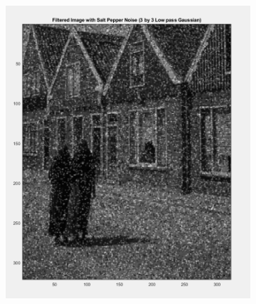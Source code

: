 \begin{figure} [ht]
    \centering
    \begin{subfigure}{0.4\textwidth}
        \includegraphics[width=\textwidth]{Resources/F7-a.png}
        \caption{}
        \label{fig:first}
    \end{subfigure}
    \hfill
    \begin{subfigure}{0.4\textwidth}

\end{subfigure}
\end{figure}
